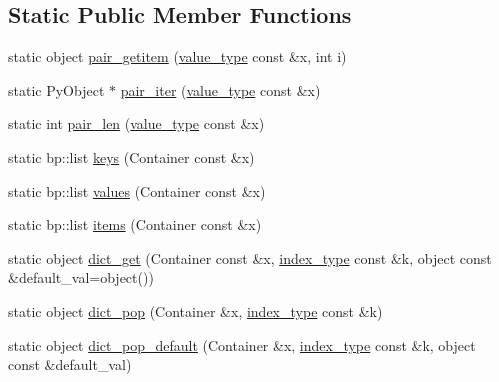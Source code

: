 \subsection*{\-Static \-Public \-Member \-Functions}
\begin{DoxyCompactItemize}
\item 
static object \hyperlink{classboost_1_1python_1_1std__map__indexing__suite_a802d62d636e685954b7abe3331de7af6}{pair\-\_\-getitem} (\hyperlink{classboost_1_1python_1_1std__map__indexing__suite_aff9ed68cf30e805a04a313d92c62ab38}{value\-\_\-type} const \&x, int i)
\item 
static \-Py\-Object $\ast$ \hyperlink{classboost_1_1python_1_1std__map__indexing__suite_a09b84169bb3b2ceb9c576c41cd63280e}{pair\-\_\-iter} (\hyperlink{classboost_1_1python_1_1std__map__indexing__suite_aff9ed68cf30e805a04a313d92c62ab38}{value\-\_\-type} const \&x)
\item 
static int \hyperlink{classboost_1_1python_1_1std__map__indexing__suite_a639bbbf3265c0cab8419b106590c3857}{pair\-\_\-len} (\hyperlink{classboost_1_1python_1_1std__map__indexing__suite_aff9ed68cf30e805a04a313d92c62ab38}{value\-\_\-type} const \&x)
\item 
static bp\-::list \hyperlink{classboost_1_1python_1_1std__map__indexing__suite_a1d08ce35eb71bc9248f64a515d6d9775}{keys} (\-Container const \&x)
\item 
static bp\-::list \hyperlink{classboost_1_1python_1_1std__map__indexing__suite_a81c04a5902c3ea0b559b56ab66e600a9}{values} (\-Container const \&x)
\item 
static bp\-::list \hyperlink{classboost_1_1python_1_1std__map__indexing__suite_a6e44b3f64f0723b75c7e00b8d46bab92}{items} (\-Container const \&x)
\item 
static object \hyperlink{classboost_1_1python_1_1std__map__indexing__suite_a6012daef85763e30ed55ef753933ff1b}{dict\-\_\-get} (\-Container const \&x, \hyperlink{classboost_1_1python_1_1std__map__indexing__suite_a4b2ac75883fba93dbca6d9e83197c842}{index\-\_\-type} const \&k, object const \&default\-\_\-val=object())
\item 
static object \hyperlink{classboost_1_1python_1_1std__map__indexing__suite_a56d69ee32c136ed83389eefae5f8df3a}{dict\-\_\-pop} (\-Container \&x, \hyperlink{classboost_1_1python_1_1std__map__indexing__suite_a4b2ac75883fba93dbca6d9e83197c842}{index\-\_\-type} const \&k)
\item 
static object \hyperlink{classboost_1_1python_1_1std__map__indexing__suite_a923cb4bd1266dd53065eba4d3c91279a}{dict\-\_\-pop\-\_\-default} (\-Container \&x, \hyperlink{classboost_1_1python_1_1std__map__indexing__suite_a4b2ac75883fba93dbca6d9e83197c842}{index\-\_\-type} const \&k, object const \&default\-\_\-val)

\end{DoxyCompactItemize}
